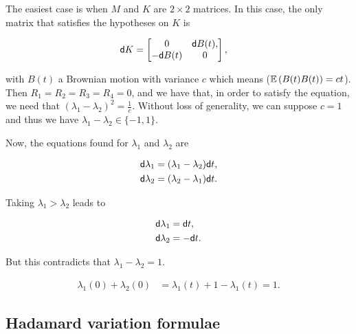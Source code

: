 The easiest case is when $M$ and $K$ are $2\times2$ matrices. In this case, the only matrix that satisfies the hypotheses on $K$ is

\begin{align*}
    \mathsf d K &= \begin{bmatrix}
        0 & \mathsf d B(t),\\
        - \mathsf d B(t) & 0
    \end{bmatrix},
\end{align*}

\noindent with $B(t)$ a Brownian motion with variance $c$ which means ($\mathbb E \left( B(t)B(t) \right) = ct$). Then $R_1 = R_2 = R_3 = R_4 = 0$, and we have that, in order to satisfy the equation, we need that $(\lambda_1 - \lambda_2)^2 = \frac1c$. Without loss of generality, we can suppose $c=1$ and thus we have $\lambda_1 - \lambda_2 \in \{-1,1\}$. 

Now, the equations found for $\lambda_1$ and $\lambda_2$ are

\begin{align*}
    \mathsf d \lambda_1 &= (\lambda_1 - \lambda_2)\mathsf d t,\\
    \mathsf d \lambda_2 &= (\lambda_2 - \lambda_1)\mathsf d t.
\end{align*}

Taking $\lambda_1 > \lambda_2$ leads to 

\begin{align*}
    \mathsf d \lambda_1 &= \mathsf d t,\\
    \mathsf d \lambda_2 &= -\mathsf d t.
\end{align*}

But this contradicts that $\lambda_1 - \lambda_2 = 1$.

\begin{align*}
    \lambda_1(0) + \lambda_2(0) &= \lambda_1(t) + 1 - \lambda_1(t) = 1.
\end{align*}

\subsection*{Hadamard variation formulae}


